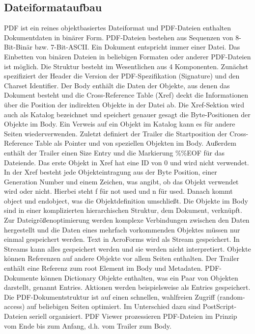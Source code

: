 \subsection{Dateiformataufbau}
PDF ist ein reines objektbasiertes Dateiformat und PDF-Dateien enthalten Dokumentdaten in binärer Form. PDF-Dateien bestehen aus Sequenzen von 8-Bit-Binär bzw. 7-Bit-ASCII. \cite{schneeberger} 
Ein Dokument entspricht immer einer Datei. Das Einbetten von binären Dateien in beliebigen Formaten oder anderer PDF-Dateien ist möglich. Die Struktur besteht im Wesentlichen aus 4 Komponenten. Zunächst spezifiziert der Header die Version der PDF-Spezifikation (Signature) und den Charset Identifier. \cite{ccc-pdf-secrets} Der Body enthält die Daten der Objekte, aus denen das Dokument besteht und die Cross-Reference Table (Xref) deckt die Informationen über die Position der indirekten Objekte in der Datei ab. Die Xref-Sektion wird auch als Katalog bezeichnet und speichert genauer gesagt die Byte-Positionen der Objekte im Body. Ein Verweis auf ein Objekt im Katalog kann es für andere Seiten wiederverwenden. Zuletzt definiert der Trailer die Startposition der Cross-Reference Table als Pointer und von speziellen Objekten im Body. \cite{ccc-break-pdf} Außerdem enthält der Trailer einen Size Entry und die Markierung \%\%EOF für das Dateiende. \cite{ccc-pdf-secrets} Das erste Objekt in Xref hat eine ID von 0 und wird nicht verwendet. In der Xref besteht jede Objekteintragung aus der Byte Position, einer Generation Number und einem Zeichen, was angibt, ob das Objekt verwendet wird oder nicht. Hierbei steht f für not used und n für used. Danach kommt object und endobject, was die Objektdefinition umschließt. 
Die Objekte im Body sind in einer komplizierten hierarchischen Struktur, dem Dokument, verknüpft. Zur Dateigrößenoptimierung werden komplexe Verbindungen zwischen den Daten hergestellt und die Daten eines mehrfach vorkommenden Objektes müssen nur einmal gespeichert werden. 
\cite{softx}
Text in AcroForms wird als Stream gespeichert. In Streams kann alles gespeichert werden und sie werden nicht interpretiert. Objekte können Referenzen auf andere Objekte vor allem Seiten enthalten. Der Trailer enthält eine Referenz zum root Element im Body \cite{ccc-break-pdf} und Metadaten.
PDF-Dokumente können Dictionary Objekte enthalten, was ein Paar von Objekten darstellt, genannt Entries. Aktionen werden beispielsweise als Entries gespeichert. \cite{ccc-badpdf}
Die PDF-Dokumentstruktur ist auf einen schnellen, wahlfreien Zugriff (random-access) auf beliebigen Seiten optimiert. Im Unterschied dazu sind PostScript-Dateien seriell organisiert. \cite{schneeberger} PDF Viewer prozessieren PDF-Dateien im Prinzip vom Ende bis zum Anfang, d.h. vom Trailer zum Body. \cite{ccc-break-pdf}
